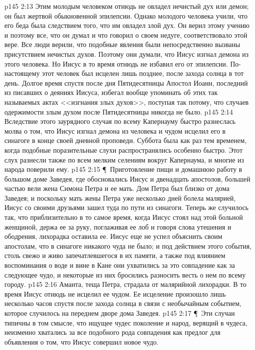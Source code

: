 \vs p145 2:13 Этим молодым человеком отнюдь не овладел нечистый дух или демон; он был жертвой обыкновенной эпилепсии. Однако молодого человека учили, что его беда была следствием того, что им овладел злой дух. Он верил этому учению и поэтому все, что он думал и что говорил о своем недуге, соответствовало этой вере. Все люди верили, что подобные явления были непосредственно вызваны присутствием нечистых духов. Поэтому они думали, что Иисус изгнал демона из этого человека. Но Иисус в то время отнюдь не избавил его от эпилепсии. По\hyp{}настоящему этот человек был исцелен лишь позднее, после захода солнца в тот день. Долгое время спустя после дня Пятидесятницы Апостол Иоанн, последний из писавших о деяниях Иисуса, избегал вообще упоминать об этих так называемых актах <<изгнания злых духов>>, поступая так потому, что случаев одержимости злым духом после Пятидесятницы никогда не было.
\vs p145 2:14 Вследствие этого заурядного случая по всему Капернауму быстро разнеслась молва о том, что Иисус изгнал демона из человека и чудом исцелил его в синагоге в конце своей дневной проповеди. Суббота была как раз тем временем, когда подобные поразительные слухи распространялись особенно быстро. Этот слух разнесли также по всем мелким селениям вокруг Капернаума, и многие из народа поверили ему.
\vs p145 2:15 \P\ Приготовление пищи и домашнюю работу в большом доме Заведея, где обосновались Иисус и двенадцать апостолов, большей частью вели жена Симона Петра и ее мать. Дом Петра был близко от дома Заведея; и поскольку мать жены Петра уже несколько дней болела малярией, Иисус со своими друзьями зашел туда по пути из синагоги. Теперь же случилось так, что приблизительно в то самое время, когда Иисус стоял над этой больной женщиной, держа ее за руку, поглаживая ее лоб и говоря слова утешения и ободрения, лихорадка оставила ее. Иисус еще не успел объяснить своим апостолам, что в синагоге никакого чуда не было; и под действием этого события, столь свежо и живо запечатлевшегося в их памяти, а также под влиянием воспоминания о воде и вине в Кане они ухватились за это совпадение как за следующее чудо, и некоторые из них бросились разносить весть о нем по всему городу.
\vs p145 2:16 Аманта, теща Петра, страдала от малярийной лихорадки. В то время Иисус отнюдь не исцелил ее чудом. Ее исцеление произошло лишь несколько часов спустя после захода солнца в связи с необычайным событием, которое случилось на переднем дворе дома Заведея.
\vs p145 2:17 \P\ Эти случаи типичны в том смысле, что ищущее чудес поколение и народ, верящий в чудеса, неизменно хватались за все подобного рода совпадения как предлог для объявления о том, что Иисус совершил новое чудо.
